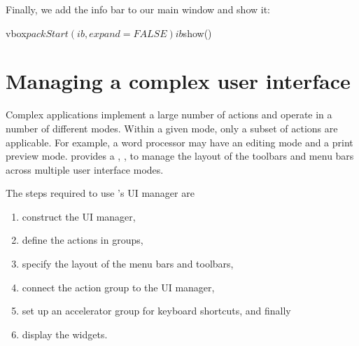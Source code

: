 Finally, we add the info bar to our main window and show it:
\begin{Schunk}
\begin{Sinput}
 vbox$packStart(ib, expand = FALSE)
 ib$show()
\end{Sinput}
\end{Schunk}

\section{Managing a complex user interface}
\label{sec:RGtk2:UIManager}

Complex applications implement a large number of actions and operate
in a number of different modes. Within a given mode, only a subset of
actions are applicable. For example, a word processor may have an
editing mode and a print preview mode. \GTK\/ provides a , , to manage the layout of
the toolbars and menu bars across multiple user interface modes.

The steps required to use \GTK's UI manager are
\begin{enumerate}
\item construct the UI manager,
\item define the actions in groups,
\item specify the layout of the menu bars and toolbars,
\item connect the action group to the UI manager, 
\item set up an accelerator group for keyboard shortcuts, and finally
\item display the widgets.
\end{enumerate}

